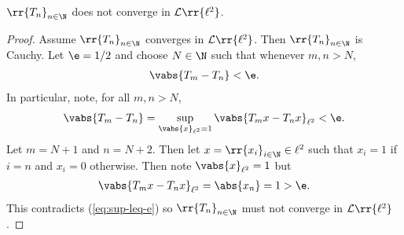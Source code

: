 \documentclass{article}
\begin{document}
\begin{claim*}[3c]
  $\rr{T_n}_{n\in\N}$ does not converge in $\mathcal L\rr{\ell^2}$.
  \begin{proof}
    Assume $\rr{T_n}_{n\in\N}$ converges in $\mathcal L\rr{\ell^2}$. Then $\rr{T_n}_{n\in\N}$
    is Cauchy. Let $\e=1/2$ and choose $N\in\N$ such that whenever $m,n>N$,
    \begin{align*}
      \vabs{T_m-T_n}<\e.
    \end{align*}
    In particular, note, for all $m,n>N$,
    \begin{align}
      \label{eq:sup-leq-e}
      \vabs{T_m-T_n} = \sup_{\vabs{x}_{\ell^2}=1} \vabs{T_m x-T_n x}_{\ell^2} < \e.
    \end{align}
    Let $m=N+1$ and $n=N+2$. Then let $x=\rr{x_i}_{i\in\N}\in\ell^2$ such that $x_i=1$ if
    $i=n$ and $x_i=0$ otherwise. Then note $\vabs{x}_{\ell^2}=1$ but
    \begin{align*}
      \vabs{T_m x-T_n x}_{\ell^2} = \abs{x_n} = 1 > \e.
    \end{align*}
    This contradicts (\ref{eq:sup-leq-e}) so $\rr{T_n}_{n\in\N}$ must not converge in $\mathcal L\rr{\ell^2}$.
  \end{proof}
\end{claim*}
\end{document}
